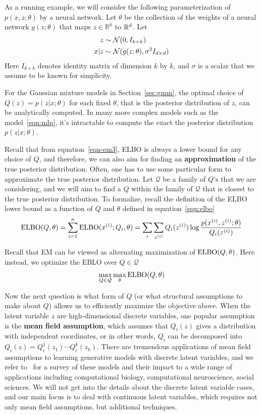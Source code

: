 \documentclass{article}
\begin{document}
As a running example, we will consider the following parameterization of $p(x,z;\theta)$ by a neural network. Let $\theta$ be the collection of the weights of a neural network $g(z;\theta)$ that maps $z\in \mathbb{R}^k$ to $\mathbb{R}^{{d}}$. Let 
\begin{align}
z & \sim \mathcal{N}(0, I_{k\times k}) \\
x\vert z & \sim \mathcal{N}(g(z;\theta),\sigma^2 I_{{d} \times {d}}) \label{eqn:mlp}
\end{align}
Here $I_{k\times k}$ denotes identity matrix of dimension $k$ by $k$, and $\sigma$ is a scalar that we assume to be known for simplicity. 



For the Gaussian mixture models in Section~\ref{sec:gmm}, the optimal choice of $Q(z)=p(z | x; \theta)$ for each fixed $\theta$, that is the posterior distribution of $z$, can be analytically computed. In many more complex models such as the model~\eqref{eqn:mlp}, it's intractable to compute the exact the posterior distribution $p(z | x;\theta)$. 

Recall that from equation~\eqref{eqn-em3}, ELBO is always a lower bound for any choice of $Q$, and therefore, we can also aim for finding an {\bf approximation} of the true posterior distribution. Often, one has to use some particular form to approximate the true posterior distribution. Let $\mathcal{Q}$ be a family of $Q$'s that we are considering, and we will aim to find a $Q$ within the family of $\mathcal{Q}$ that is closest to the true posterior distribution. To formalize, recall the definition of the ELBO lower bound as a function of $Q$ and $\theta$ defined in equation~\eqref{eqn:elbo}
\begin{align}
\textup{ELBO}(Q, \theta) = \sum_{i=1}^{n} \textup{ELBO}({x^{(i)}}; Q_i,\theta) = \sum_i \sum_{z^{(i)}} Q_i({z^{(i)}}) \log \frac{p({x^{(i)}}, {z^{(i)}}; \theta)}{Q_i({z^{(i)}})} \nonumber
\end{align}

Recall that EM can be viewed as alternating maximization of $\textup{ELBO}(Q,\theta)$. Here instead, we optimize the EBLO over $Q\in \mathcal{Q}$
\begin{align}
\max_{Q\in \mathcal{Q}}\max_{\theta} \textup{ELBO}(Q, \theta) \label{eqn:meta}
\end{align}

Now the next question is what form of $Q$ (or what structural assumptions to make about $Q$) allows us to efficiently maximize the objective above. When the latent variable $z$ are high-dimensional discrete variables, one popular assumption is the {\bf mean field assumption}, which assumes that $Q_i(z)$ gives a distribution with independent coordinates, or in other words, $Q_i$ can be decomposed into $Q_i(z) = Q_i^1(z_1)\cdots Q_i^k(z_k)$. There are tremendous applications of mean field assumptions to learning generative models with discrete latent variables, and we refer to~\cite{blei2017variational} for a survey of these models and their impact to a wide range of applications including computational biology, computational neuroscience, social sciences.  We will not get into the details about the discrete latent variable cases, and our main focus is to deal with continuous latent variables, which requires not only mean field assumptions, but additional techniques. 
\end{document}
